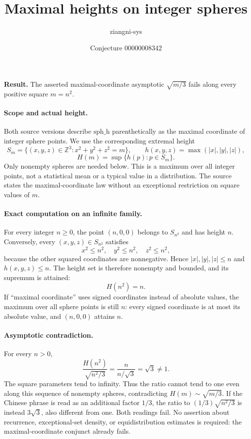 \documentclass[11pt]{article}
\title{Maximal heights on integer spheres}
\author{ziangni-sys}
\date{Conjecture 00000008342}
\begin{document}
\raggedright
\maketitle
\noindent\textbf{Result.} The asserted maximal-coordinate asymptotic $\sqrt{m/3}$ fails along every positive square $m=n^2$.

\paragraph{Scope and actual height.}
Both source versions describe $\mathrm{sph\_h}$ parenthetically as the maximal coordinate of integer sphere points. We use the corresponding extremal height
\[
S_m=\{(x,y,z)\in\mathbb Z^3:x^2+y^2+z^2=m\},\qquad
h(x,y,z)=\max(|x|,|y|,|z|),
\]
\[
H(m)=\sup\{h(p):p\in S_m\}.
\]
Only nonempty spheres are needed below. This is a maximum over all integer points, not a statistical mean or a typical value in a distribution. The source states the maximal-coordinate law without an exceptional restriction on square values of $m$.

\paragraph{Exact computation on an infinite family.}
For every integer $n\geq0$, the point $(n,0,0)$ belongs to $S_{n^2}$ and has height $n$. Conversely, every $(x,y,z)\in S_{n^2}$ satisfies
\[
x^2\leq n^2,\quad y^2\leq n^2,\quad z^2\leq n^2,
\]
because the other squared coordinates are nonnegative. Hence $|x|,|y|,|z|\leq n$ and $h(x,y,z)\leq n$. The height set is therefore nonempty and bounded, and its supremum is attained:
\[
\boxed{H(n^2)=n.}
\]
If ``maximal coordinate'' uses signed coordinates instead of absolute values, the maximum over all sphere points is still $n$: every signed coordinate is at most its absolute value, and $(n,0,0)$ attains $n$.

\paragraph{Asymptotic contradiction.}
For every $n>0$,
\[
\frac{H(n^2)}{\sqrt{n^2/3}}=\frac{n}{n/\sqrt3}=\sqrt3\ne1.
\]
The square parameters tend to infinity. Thus the ratio cannot tend to one even along this sequence of nonempty spheres, contradicting $H(m)\sim\sqrt{m/3}$. If the Chinese phrase is read as an additional factor $1/3$, the ratio to $(1/3)\sqrt{n^2/3}$ is instead $3\sqrt3$, also different from one. Both readings fail. No assertion about recurrence, exceptional-set density, or equidistribution estimates is required: the maximal-coordinate conjunct already fails.
\end{document}

